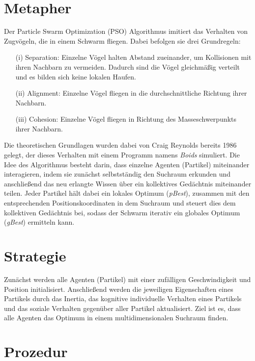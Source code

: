 
\section{Metapher}

Der Particle Swarm Optimization (PSO) Algorithmus imitiert das Verhalten von
Zugvögeln, die in einem Schwarm fliegen. Dabei befolgen sie drei Grundregeln:
\begin{enumerate}
    \item[(i)] Separation: Einzelne Vögel halten Abstand zueinander, um
        Kollisionen mit ihren Nachbarn zu vermeiden. Dadurch sind die Vögel
        gleichmäßig verteilt und es bilden sich keine lokalen Haufen.
    \item[(ii)] Alignment: Einzelne Vögel fliegen in die durchschnittliche
        Richtung ihrer Nachbarn. 
    \item[(iii)] Cohesion: Einzelne Vögel fliegen in Richtung des
        Masseschwerpunkts ihrer Nachbarn.
\end{enumerate}

Die theoretischen Grundlagen wurden dabei von Craig Reynolds bereits 1986
gelegt, der dieses Verhalten mit einem Programm namens \emph{Boids}
simuliert. Die Idee des Algorithmus besteht darin, dass einzelne Agenten
(Partikel) miteinander interagieren, indem sie zunächst selbstständig den
Suchraum erkunden und anschließend das neu erlangte Wissen über ein
kollektives Gedächtnis miteinander teilen. Jeder Partikel hält dabei
ein lokales Optimum (\emph{pBest}), zusammen mit den entsprechenden
Positionskoordinaten in dem Suchraum und steuert dies dem kollektiven
Gedächtnis bei, sodass der Schwarm iterativ ein globales Optimum (\emph{gBest})
ermitteln kann.

\section{Strategie}

Zunächst werden alle Agenten (Partikel) mit einer zufälligen Geschwindigkeit
und Position initialisiert. Anschließend werden die jeweiligen Eigenschaften
eines Partikels durch das Inertia, das kognitive individuelle Verhalten eines
Partikels und das soziale Verhalten gegenüber aller Partikel aktualisiert. Ziel
ist es, dass alle Agenten das Optimum in einem multidimensionalen Suchraum
finden.

\section{Prozedur}

